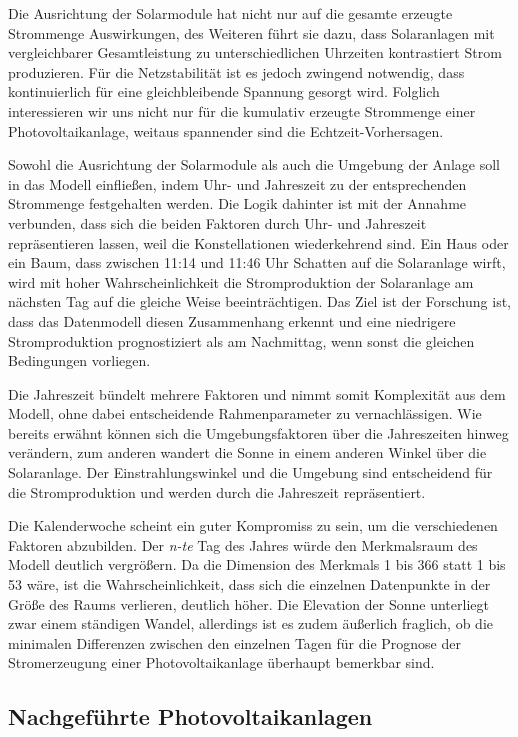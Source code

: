 \documentclass[12pt, a4paper]{article}
\begin{document}
Die Ausrichtung der Solarmodule hat nicht nur auf die gesamte erzeugte Strommenge Auswirkungen, des Weiteren führt sie dazu, dass Solaranlagen mit vergleichbarer Gesamtleistung zu unterschiedlichen Uhrzeiten kontrastiert Strom produzieren. Für die Netzstabilität ist es jedoch zwingend notwendig, dass kontinuierlich für eine gleichbleibende Spannung gesorgt wird. Folglich interessieren wir uns nicht nur für die kumulativ erzeugte Strommenge einer Photovoltaikanlage, weitaus spannender sind die Echtzeit-Vorhersagen. 

Sowohl die Ausrichtung der Solarmodule als auch die Umgebung der Anlage soll in das Modell einfließen, indem Uhr- und Jahreszeit zu der entsprechenden Strommenge festgehalten werden. Die Logik dahinter ist mit der Annahme verbunden, dass sich die beiden Faktoren durch Uhr- und Jahreszeit repräsentieren lassen, weil die Konstellationen wiederkehrend sind. Ein Haus oder ein Baum, dass zwischen 11:14 und 11:46 Uhr Schatten auf die Solaranlage wirft, wird mit hoher Wahrscheinlichkeit die Stromproduktion der Solaranlage am nächsten Tag auf die gleiche Weise beeinträchtigen. Das Ziel ist der Forschung ist, dass das Datenmodell diesen Zusammenhang erkennt und eine niedrigere Stromproduktion prognostiziert als am Nachmittag, wenn sonst die gleichen Bedingungen vorliegen.

Die Jahreszeit bündelt mehrere Faktoren und nimmt somit Komplexität aus dem Modell, ohne dabei entscheidende Rahmenparameter zu vernachlässigen. Wie bereits erwähnt können sich die Umgebungsfaktoren über die Jahreszeiten hinweg verändern, zum anderen wandert die Sonne in einem anderen Winkel über die Solaranlage. Der Einstrahlungswinkel und die Umgebung sind entscheidend für die Stromproduktion und werden durch die Jahreszeit repräsentiert.

 Die Kalenderwoche scheint ein guter Kompromiss zu sein, um die verschiedenen Faktoren abzubilden. Der \textit{n-te} Tag des Jahres würde den Merkmalsraum des Modell deutlich vergrößern. Da die Dimension des Merkmals 1 bis 366 statt 1 bis 53 wäre, ist die Wahrscheinlichkeit, dass sich die einzelnen Datenpunkte in der Größe des Raums verlieren, deutlich höher. Die Elevation der Sonne unterliegt zwar einem ständigen Wandel, allerdings ist es zudem äußerlich fraglich, ob die minimalen Differenzen zwischen den einzelnen Tagen für die Prognose der Stromerzeugung einer Photovoltaikanlage überhaupt bemerkbar sind.

 

\subsection{Nachgeführte Photovoltaikanlagen}
\end{document}
